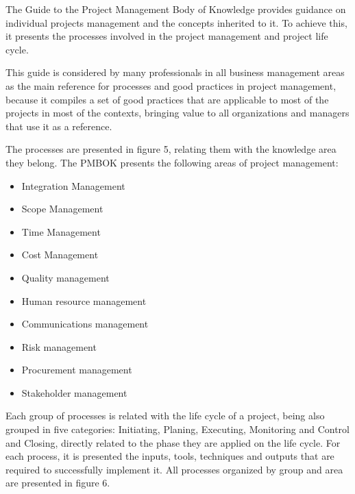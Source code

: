 The Guide to the Project Management Body of Knowledge provides guidance on individual projects management and the concepts inherited to it. To achieve this, it presents the processes involved in the project management and project life cycle.\cite{pmbok5}\par
This guide is considered by many professionals in all business management areas as the main reference for processes and good practices in project management, because it compiles a set of good practices that are applicable to most of the projects in most of the contexts, bringing value to all organizations and managers that use it as a reference.\par 
The processes are presented in figure 5, relating them with the knowledge area they belong. The PMBOK presents the following areas of project management:

\begin{itemize}
  \item Integration Management
  \item Scope Management
  \item Time Management
  \item Cost Management
  \item Quality management
  \item Human resource management
  \item Communications management
  \item Risk management
  \item Procurement management
  \item Stakeholder management
\end{itemize} 

Each group of processes is related with the life cycle of a project, being also grouped in five categories: Initiating, Planing, Executing, Monitoring and Control and Closing, directly related to the phase they are applied on the life cycle. For each process, it is presented the inputs, tools, techniques and outputs that are required to successfully implement it. All processes organized by group and area are presented in figure 6.\par

